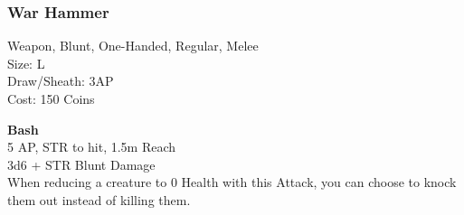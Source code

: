 \subsubsection{War Hammer}\label{weapon:warHammer}
Weapon, Blunt, One-Handed, Regular, Melee\\
Size: L\\
Draw/Sheath: 3AP\\
Cost: 150 Coins

\textbf{Bash}\\
5 AP, STR to hit, 1.5m Reach\\
3d6 + \texttimes STR Blunt Damage\\
When reducing a creature to 0 Health with this Attack, you can choose to knock them out instead of killing them.